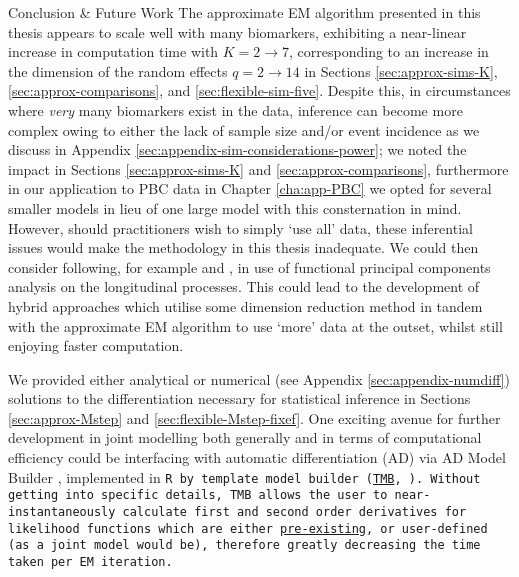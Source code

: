 \begin{chapter}{\label{cha:conclusion}Conclusion \& Future Work}
The approximate EM algorithm presented in this thesis appears to scale well with many biomarkers, exhibiting a near-linear increase in computation time with $K=2\rightarrow7$, corresponding to an increase in the dimension of the random effects $q=2\rightarrow14$ in Sections \ref{sec:approx-sims-K}, \ref{sec:approx-comparisons}, and \ref{sec:flexible-sim-five}. Despite this, in circumstances where \textit{very} many biomarkers exist in the data, inference can become more complex owing to either the lack of sample size and/or event incidence as we discuss in Appendix \ref{sec:appendix-sim-considerations-power}; we noted the impact in Sections \ref{sec:approx-sims-K} and \ref{sec:approx-comparisons}, furthermore in our application to PBC data in Chapter \ref{cha:app-PBC} we opted for several smaller models in lieu of one large model with this consternation in mind.\newline 
However, should practitioners wish to simply `use all' data, these inferential issues would make the methodology in this thesis inadequate. We could then consider following, for example \citet{Li2017B} and \citet{Li2021}, in use of functional principal components analysis on the longitudinal processes. This could lead to the development of hybrid approaches which utilise some dimension reduction method in tandem with the approximate EM algorithm to use `more' data at the outset, whilst still enjoying faster computation.

We provided either analytical or numerical (see Appendix \ref{sec:appendix-numdiff}) solutions to the differentiation necessary for statistical inference in Sections \ref{sec:approx-Mstep} and \ref{sec:flexible-Mstep-fixef}. One exciting avenue for further development in joint modelling both generally and in terms of computational efficiency could be interfacing with automatic differentiation (AD) via AD Model Builder \citep{ADMB-paper}, implemented in \tt{R} by template model builder (\href{https://kaskr.github.io/adcomp/Introduction.html}{\textcolor{nclblue}{\tt{TMB}}}, \citet{R-TMB}). Without getting into specific details, \tt{TMB} allows the user to near-instantaneously calculate first and second order derivatives for likelihood functions which are either \href{https://kaskr.github.io/adcomp/distributions__R_8hpp_source.html}{\textcolor{nclblue}{pre-existing}}, or user-defined (as a joint model would be), therefore greatly decreasing the time taken per EM iteration.

\end{chapter}
